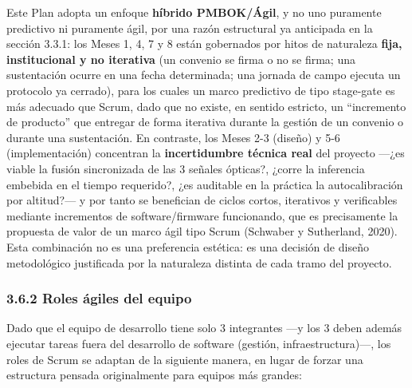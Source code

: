 \documentclass[11pt,a4paper]{article}
\begin{document}
Este Plan adopta un enfoque \textbf{híbrido PMBOK/Ágil}, y no uno puramente predictivo ni puramente ágil, por una razón estructural ya anticipada en la sección 3.3.1: los Meses 1, 4, 7 y 8 están gobernados por hitos de naturaleza \textbf{fija, institucional y no iterativa} (un convenio se firma o no se firma; una sustentación ocurre en una fecha determinada; una jornada de campo ejecuta un protocolo ya cerrado), para los cuales un marco predictivo de tipo stage-gate es más adecuado que Scrum, dado que no existe, en sentido estricto, un ``incremento de producto'' que entregar de forma iterativa durante la gestión de un convenio o durante una sustentación. En contraste, los Meses 2-3 (diseño) y 5-6 (implementación) concentran la \textbf{incertidumbre técnica real} del proyecto ---¿es viable la fusión sincronizada de las 3 señales ópticas?, ¿corre la inferencia embebida en el tiempo requerido?, ¿es auditable en la práctica la autocalibración por altitud?--- y por tanto se benefician de ciclos cortos, iterativos y verificables mediante incrementos de software/firmware funcionando, que es precisamente la propuesta de valor de un marco ágil tipo Scrum (Schwaber y Sutherland, 2020). Esta combinación no es una preferencia estética: es una decisión de diseño metodológico justificada por la naturaleza distinta de cada tramo del proyecto.

\subsubsection{3.6.2 Roles ágiles del equipo}\label{roles-uxe1giles-del-equipo}

Dado que el equipo de desarrollo tiene solo 3 integrantes ---y los 3 deben además ejecutar tareas fuera del desarrollo de software (gestión, infraestructura)---, los roles de Scrum se adaptan de la siguiente manera, en lugar de forzar una estructura pensada originalmente para equipos más grandes:
\end{document}
